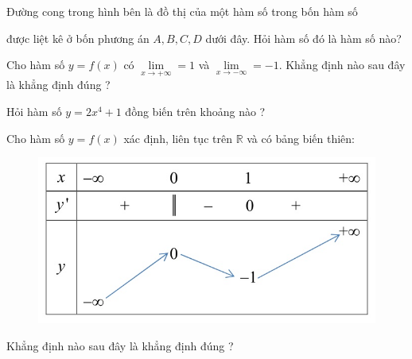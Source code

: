 


\begin{vnmultiplechoice}[ rearrange=yes, keycolumns=5]%

\begin{question}%
Đường cong trong hình bên là đồ thị của một hàm số trong bốn hàm số 

được liệt kê ở bốn phương án $A, B, C, D$ dưới
đây.
 Hỏi hàm số đó là hàm số nào?
\datcot
\bonpa
{}
{}
{}
{}
\end{question}


\begin{question}%
Cho hàm số $y=f(x)$ có  $\lim\limits_{x\rightarrow +\infty}=1$ và   $\lim\limits_{x\rightarrow -\infty}=-1$. Khẳng định nào sau
đây là khẳng định đúng ?
\datcot[4]
\bonpa
{}
{}
{}
{}
\end{question}


\begin{question}%
 Hỏi hàm số $y=2x^4+1$  đồng biến trên khoảng nào ?
\datcot[2]
\bonpa
{}
{}
{}
{}
\end{question}

\begin{question}%
Cho hàm số  $y=f(x)$ xác định, liên tục trên $\mathbb{R}$ và có bảng biến thiên:

\begin{figure}
\examvspace*{-0.5cm}
\includegraphics[scale =0.5]{toan02}
\end{figure}
Khẳng định nào sau đây là khẳng định đúng ?
\datcot[4]
\bonpa
{}
{}
{}
{}
\end{question}



\end{vnmultiplechoice}
